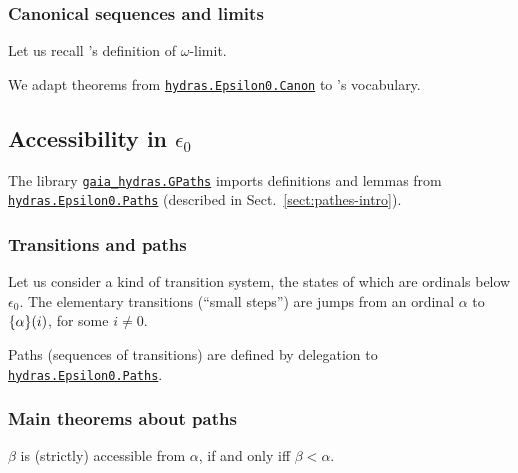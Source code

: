 \subsubsection{Canonical sequences and limits}


Let us recall \gaia's definition of $\omega$-limit.


We adapt theorems from \href{../theories/html/hydras.Epsilon0.Canon.html}%
{\texttt{hydras.Epsilon0.Canon}} to \gaia's vocabulary.


\subsection{Accessibility in \texorpdfstring{$\epsilon_0$}{epsilon\_0}}
\label{sect:gpath}

The library \href{../theories/html/gaia_hydras.GPaths.html}%
{\texttt{gaia\_hydras.GPaths}} imports definitions and lemmas from
\href{../theories/html/hydras.Epsilon0.Paths.html}%
{\texttt{hydras.Epsilon0.Paths}} (described in Sect.~\ref{sect:pathes-intro}).


\subsubsection{Transitions and paths}
Let us consider a kind of transition system, the states of which are ordinals below $\epsilon_0$. The elementary transitions (``small steps'') are jumps from an ordinal $\alpha$ to $\mbox{$\{\alpha\}(i)$}$, for some $i\not=0$.


Paths (sequences of transitions) are defined by delegation to
\href{../theories/html/hydras.Epsilon0.Paths.html}%
{\texttt{hydras.Epsilon0.Paths}}.


\subsubsection{Main theorems about paths}

$\beta$ is (strictly) accessible from $\alpha$, if and only iff
$\beta<\alpha$.


